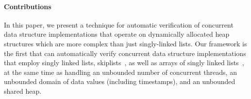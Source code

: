 
\vspace*{-0.6cm}
\paragraph{Contributions}
In this paper, we present a technique for automatic verification of concurrent
data structure implementations that operate on dynamically allocated
heap structures which are more complex than just singly-linked lists.
Our framework is the first that
can automatically verify concurrent data structure implementations that employ
singly linked lists, skiplists~\cite{Fomitchev:2004,ArtOfMpP,Sundell:2005},
as well as arrays of singly linked lists~\cite{ts-stack},
at the same time as handling an unbounded
number of concurrent threads, an unbounded domain of data values
(including timestamps), and an unbounded shared heap.

